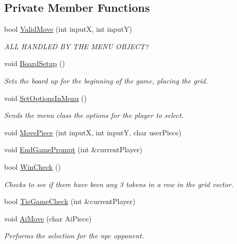 \subsection*{Private Member Functions}
\begin{DoxyCompactItemize}
\item 
bool \hyperlink{classTicTacToe_ab3e52a3c1bb9fefe08f4c4641f8a70f8}{Valid\-Move} (int input\-X, int input\-Y)
\begin{DoxyCompactList}\small\item\em A\-L\-L H\-A\-N\-D\-L\-E\-D B\-Y T\-H\-E M\-E\-N\-U O\-B\-J\-E\-C\-T? \end{DoxyCompactList}\item 
void \hyperlink{classTicTacToe_a5a03afaffde20d826472e7a8e27995e4}{Board\-Setup} ()
\begin{DoxyCompactList}\small\item\em Sets the board up for the beginning of the game, placing the grid. \end{DoxyCompactList}\item 
void \hyperlink{classTicTacToe_a5fd34a83c96edbcf3c3c5a0930d513fb}{Set\-Options\-In\-Menu} ()
\begin{DoxyCompactList}\small\item\em Sends the menu class the options for the player to select. \end{DoxyCompactList}\item 
void \hyperlink{classTicTacToe_afb236f340525d12a81667a340440b210}{Move\-Piece} (int input\-X, int input\-Y, char user\-Piece)
\item 
void \hyperlink{classTicTacToe_a1cd5593db7859cb3788a96a0069d42d7}{End\-Game\-Prompt} (int \&current\-Player)
\item 
bool \hyperlink{classTicTacToe_afe8f0ecd818f9f6b8418b7e597ff56a7}{Win\-Check} ()
\begin{DoxyCompactList}\small\item\em Checks to see if there have been any 3 tokens in a row in the grid vector. \end{DoxyCompactList}\item 
bool \hyperlink{classTicTacToe_a8134bdddf731a29f61f42273e23f1abf}{Tie\-Game\-Check} (int \&current\-Player)
\item 
void \hyperlink{classTicTacToe_a457647024a551cb3d574d47a9ca85091}{Ai\-Move} (char Ai\-Piece)
\begin{DoxyCompactList}\small\item\em Performs the selection for the npc opponent. \end{DoxyCompactList}\item 

\end{DoxyCompactItemize}
